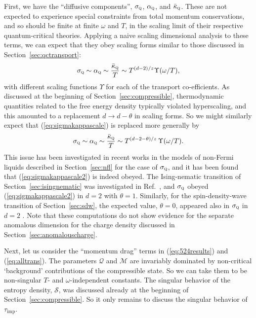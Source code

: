 \documentclass[10pt, oneside]{book}
\begin{document}
\begin{doublespace}
First, we have the ``diffusive components'', $\sigma_{\textsc{q}}$, $\alpha_{\textsc{q}}$, and $\bar\kappa_{\textsc{q}}$.
These are not expected to experience special constraints from total momentum conservations, and so should be finite at 
finite $\omega$ and $T$, in the scaling limit of their respective quantum-critical theories. Applying a naive scaling dimensional
analysis to these terms, we can expect that they obey scaling forms similar to those discussed in Section~\ref{sec:qctransport}:
\begin{equation}
\sigma_{\textsc{q}} \sim \alpha_{\textsc{q}} \sim \frac{\bar\kappa_{\textsc{q}}}{T} \sim T^{(d-2)/z} \Upsilon (\omega/T),
\label{eq:sigmakappascale}
\end{equation}
with different scaling functions $\Upsilon$ for each of the transport co-efficients. As discussed at the beginning of Section~\ref{sec:compressible}, 
thermodynamic quantities related to the free energy density typically violated hyperscaling, and this amounted to a replacement 
$d \rightarrow d - \theta$ in scaling forms. So we might similarly expect that (\ref{eq:sigmakappascale}) is replaced more generally by
\begin{equation}
\sigma_{\textsc{q}} \sim \alpha_{\textsc{q}} \sim \frac{\bar\kappa_{\textsc{q}}}{T} \sim T^{(d-2-\theta)/z} \, \Upsilon (\omega/T).
\label{eq:sigmakappascale2}
\end{equation}
This issue has been investigated in recent works in the models of non-Fermi liquids described in Section~\ref{sec:nfl} for the case of 
$\sigma_{\textsc{q}}$, and it has been found that (\ref{eq:sigmakappascale2}) is indeed obeyed. The Ising-nematic transition of Section~\ref{sec:isingnematic} was investigated in Ref.~\cite{Eberlein16}, and $\sigma_{\textsc{q}}$ obeyed (\ref{eq:sigmakappascale2}) in $d=2$
with $\theta = 1$. Similarly, for the spin-density-wave transition of Section~\ref{sec:sdw}, the expected value, $\theta = 0$, appeared
also in $\sigma_{\textsc{q}}$ in $d=2$ \cite{metlitski3,strack1}. Note that these computations do not show evidence for the separate anomalous dimension for the charge density discussed in Section~\ref{sec:anomalouscharge}. 

Next, let us consider the ``momentum drag'' terms in (\ref{eq:524results}) and (\ref{eq:alltrans}). The parameters $\mathcal{Q}$ and $\mathcal{M}$ are invariably dominated by non-critical `background' contributions of the compressible state. So we can take them to 
be non-singular $T$- and $\omega$-independent constants. The singular behavior of the entropy density, $\mathcal{S}$, was discussed already
at the beginning of Section~\ref{sec:compressible}. So it only remains to discuss the singular behavior of $\tau_{\mathrm{imp}}$.


\end{doublespace}
\end{document}
